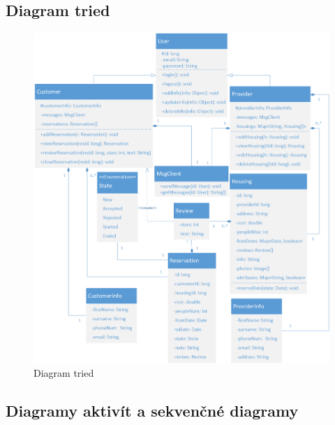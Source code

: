 \newpage

\subsection{Diagram tried}

\begin{figure}[!htbp]
    \centering
    \includegraphics[width=\linewidth]{img/class_diagram.png}
    \caption{Diagram tried}
    \label{class_diagram}
\end{figure}

\newpage

\subsection{Diagramy aktivít a sekvenčné diagramy}

